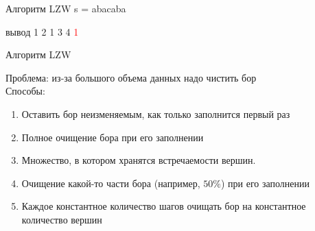 \documentclass[12pt]{beamer}
\begin{document}
\begin{frame}[fragile]{Алгоритм LZW}
s = abacaba
\begin{center}

\begin{block}{вывод}
1 2 1 3 4 \textcolor{red}{1}
\end{block}

\end{center}
\end{frame}

\begin{frame}{Алгоритм LZW}

    Проблема: из-за большого объема данных надо чистить бор \\

    Способы:

    \begin{enumerate}

        \item <2-> Оставить бор неизменяемым, как только заполнится первый раз

        \item <3-> Полное очищение бора при его заполнении

        \item <4-> Множество, в котором хранятся встречаемости вершин.
        
        \item <5-> Очищение какой-то части бора (например, $50\%$) при его
        заполнении

        \item <6-> Каждое константное количество шагов очищать бор на 
        константное количество вершин

    \end{enumerate}
    
\end{frame}
\end{document}
